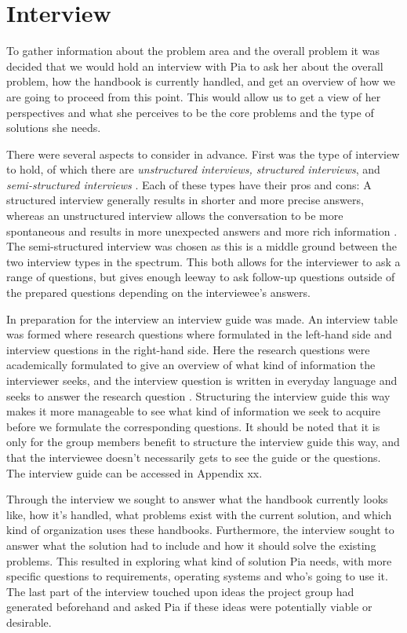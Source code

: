 \section{Interview} \label{sec:interview}

To gather information about the problem area and the overall problem it was decided that
we would hold an interview with Pia to ask her about the overall problem, how the handbook is currently handled, and get an overview of how we are going to proceed from this point. This would allow us to get a view of her perspectives and what she perceives to be the core problems and the type of solutions she needs.

There were several aspects to consider in advance. First was the type of interview to hold, of which there are \textit{unstructured interviews, structured interviews}, and \textit{semi-structured interviews} \citep{interactionhci}. Each of these types have their pros and cons: A structured interview generally results in shorter and more precise answers, whereas an unstructured interview allows the conversation to be more spontaneous and results in more unexpected answers and more rich information \citep{interview}. The semi-structured interview was chosen as this is a middle ground between the two interview types in the spectrum. This both allows for the interviewer to ask a range of questions, but gives enough leeway to ask follow-up questions outside of the prepared questions depending on the interviewee’s answers.

In preparation for the interview an interview guide was made. An interview table was formed where research questions where formulated in the left-hand side and interview questions in the right-hand side. Here the research questions were academically formulated to give an overview of what kind of information the interviewer seeks, and the interview question is written in everyday language and seeks to answer the research question \citep{interview}. Structuring the interview guide this way makes it more manageable to see what kind of information we seek to acquire before we formulate the corresponding questions. It should be noted that it is only for the group members benefit to structure the interview guide this way, and that the interviewee doesn’t necessarily gets to see the guide or the questions. The interview guide can be accessed in Appendix xx.

Through the interview we sought to answer what the handbook currently looks like, how it’s handled, what problems exist with the current solution, and which kind of organization uses these handbooks. Furthermore, the interview sought to answer what the solution had to include and how it should solve the existing problems. This resulted in exploring what kind of solution Pia needs, with more specific questions to requirements, operating systems and who’s going to use it. The last part of the interview touched upon ideas the project group had generated beforehand and asked Pia if these ideas were potentially viable or desirable.

